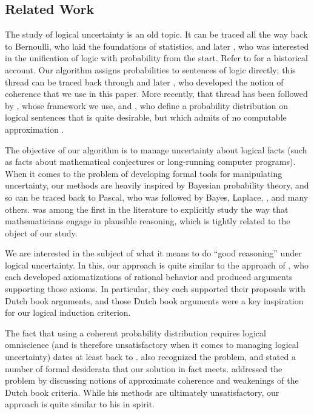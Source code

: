 \documentclass[authordate,onecolumn,noenvironments]{miri-tech-article}
\numberwithin{equation}{subsection}
\begin{document}
\subsection{Related Work}\label{sec:relatedwork}

The study of logical uncertainty is an old topic. It can be traced all the way back to Bernoulli, who laid the foundations of statistics, and later \citet{boole1854investigation}, who was interested in the unification of logic with probability from the start. Refer to \citet{hailperin1996sentential} for a historical account. Our algorithm assigns probabilities to sentences of logic directly; this thread can be traced back through \citet{Los:1955} and later \citet{Gaifman:1964}, who developed the notion of coherence that we use in this paper. More recently, that thread has been followed by \citet{Demski:2012a}, whose framework we use, and \citet{Hutter:2013}, who define a probability distribution on logical sentences that is quite desirable, but which admits of no computable approximation \citep{Sawin:2013:pi1pi2}.

The objective of our algorithm is to manage uncertainty about logical facts (such as facts about mathematical conjectures or long-running computer programs). When it comes to the problem of developing formal tools for manipulating uncertainty, our methods are heavily inspired by Bayesian probability theory, and so can be traced back to Pascal, who was followed by Bayes, Laplace, \citet{kolmogorov1950foundations,savage1954foundations,Carnap:1962:LogicalProbability,Jaynes:2003}, and many others. \citet{polya1990mathematics} was among the first in the literature to explicitly study the way that mathematicians engage in plausible reasoning, which is tightly related to the object of our study.

We are interested in the subject of what it means to do ``good reasoning'' under logical uncertainty. In this, our approach is quite similar to the approach of
\citet{Ramsey:1931,DeFinetti:1937:foresight,Von-Neumann:1944,teller1973conditionalization,lewis1999papers,Joyce:1999}, who each developed axiomatizations of rational behavior and produced arguments supporting those axioms. In particular, they each supported their proposals with Dutch book arguments, and those Dutch book arguments were a key inspiration for our logical induction criterion.

The fact that using a coherent probability distribution requires logical omniscience (and is therefore unsatisfactory when it comes to managing logical uncertainty) dates at least back to \citet{Good:1950:weighing}. \citet{Savage:1967:personal} also recognized the problem, and stated a number of formal desiderata that our solution in fact meets. \citet{Hacking:1967} addressed the problem by discussing notions of approximate coherence and weakenings of the Dutch book criteria. While his methods are ultimately unsatisfactory, our approach is quite similar to his in spirit.
\end{document}
